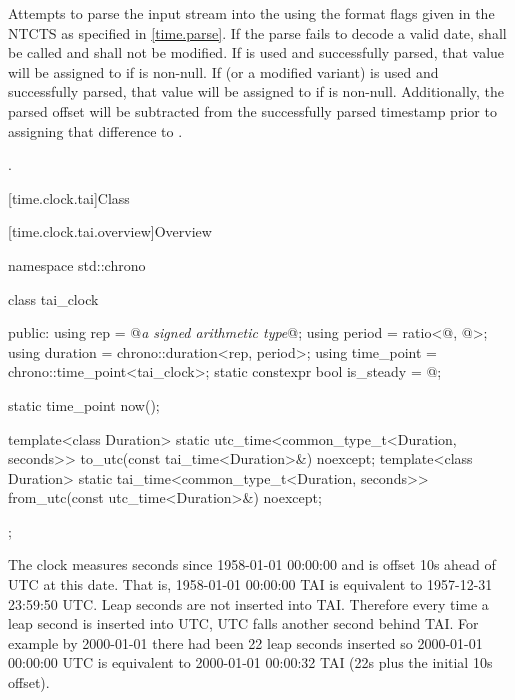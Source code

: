 \begin{itemdescr}
\pnum
\effects
Attempts to parse the input stream 
into the   using
the format flags given in the NTCTS 
as specified in \ref{time.parse}.
If the parse fails to decode a valid date,
 shall be called
and  shall not be modified.
If  is used and successfully parsed,
that value will be assigned to  if  is non-null.
If  (or a modified variant) is used and successfully parsed,
that value will be assigned to  if  is non-null.
Additionally, the parsed offset will be subtracted from
the successfully parsed timestamp
prior to assigning that difference to .

\pnum
\returns {}.
\end{itemdescr}

[time.clock.tai]{Class }

[time.clock.tai.overview]{Overview}
%

\begin{codeblock}
namespace std::chrono {
  class tai_clock {
  public:
    using rep                       = @\textit{a signed arithmetic type}@;
    using period                    = ratio<@\unspecnc@, @\unspec@>;
    using duration                  = chrono::duration<rep, period>;
    using time_point                = chrono::time_point<tai_clock>;
    static constexpr bool is_steady = @\unspec@;

    static time_point now();

    template<class Duration>
      static utc_time<common_type_t<Duration, seconds>>
        to_utc(const tai_time<Duration>&) noexcept;
    template<class Duration>
      static tai_time<common_type_t<Duration, seconds>>
        from_utc(const utc_time<Duration>&) noexcept;
  };
}
\end{codeblock}

\pnum
The clock  measures seconds since 1958-01-01 00:00:00
and is offset 10s ahead of UTC at this date.
That is, 1958-01-01 00:00:00 TAI is equivalent to 1957-12-31 23:59:50 UTC.
Leap seconds are not inserted into TAI.
Therefore every time a leap second is inserted into UTC,
UTC falls another second behind TAI.
For example by 2000-01-01 there had been 22 leap seconds inserted
so 2000-01-01 00:00:00 UTC is equivalent to 2000-01-01 00:00:32 TAI
(22s plus the initial 10s offset).


